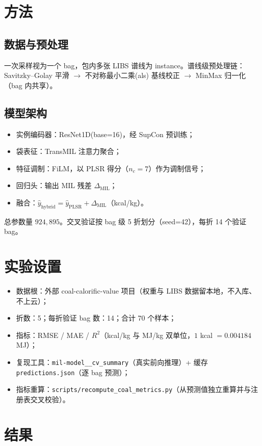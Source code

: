 \documentclass[11pt,a4paper,UTF8]{ctexart}
\begin{document}
\section{方法}
\subsection{数据与预处理}
一次采样视为一个 bag，包内多张 LIBS 谱线为 instance。谱线级预处理链：
Savitzky--Golay 平滑 $\to$ 不对称最小二乘(als) 基线校正 $\to$ MinMax 归一化（bag 内共享）。

\subsection{模型架构}
\begin{itemize}
\item 实例编码器：ResNet1D(base=16)，经 SupCon 预训练；
\item 袋表征：TransMIL 注意力聚合；
\item 特征调制：FiLM，以 PLSR 得分（$n_c=7$）作为调制信号；
\item 回归头：输出 MIL 残差 $\Delta_{\text{MIL}}$；
\item 融合：$\hat{y}_{\text{hybrid}} = \hat{y}_{\text{PLSR}} + \Delta_{\text{MIL}}$（kcal/kg）。
\end{itemize}
总参数量 $924{,}895$。交叉验证按 bag 级 5 折划分（seed=42），每折 14 个验证 bag。

\section{实验设置}
\begin{itemize}
\item 数据根：外部 coal-calorific-value 项目（权重与 LIBS 数据留本地，不入库、不上云）；
\item 折数：5；每折验证 bag 数：14；合计 70 个样本；
\item 指标：RMSE / MAE / $R^2$（kcal/kg 与 MJ/kg 双单位，$1$ kcal $= 0.004184$ MJ）；
\item 复现工具：\texttt{mil-model\_\_cv\_summary}（真实前向推理）+ 缓存 \texttt{predictions.json}（逐 bag 预测）；
\item 指标重算：\texttt{scripts/recompute\_coal\_metrics.py}（从预测值独立重算并与注册表交叉校验）。
\end{itemize}

\section{结果}
\end{document}
